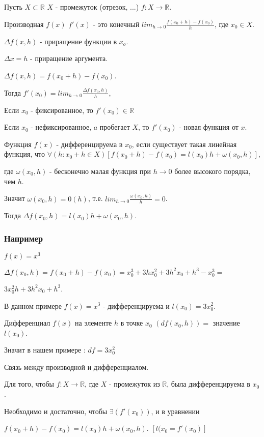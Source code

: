 Пусть $X \subset \mathbb {R}$ $X$ - промежуток (отрезок, ...) $f : X \rightarrow \mathbb {R}$.

\opred

Производная $f(x)$ $f'(x)$ - это конечный $lim_{h \to 0} \frac {f(x_0 + h) - f(x_0)}{h}$, где $x_0 \in X$.

$\Delta f(x,h)$ - приращение функции в $x_o$.

$\Delta x = h$ - приращение аргумента.

$\Delta f(x,h) = f(x_0 + h) - f(x_0)$.

Тогда $f'(x_0)= lim_{h \to 0} \frac{\Delta f(x_0,h)}{h}$,

Если $x_0$ - фиксированное, то $f'(x_0) \in \mathbb {R}$

Если $x_0$ - нефиксированное, $a$ пробегает $X$, то $f'(x_0)$ - новая функция от $x$.

\opred
	
Функция $f(x)$ - дифференцируема в $x_0$, если существует такая линейная функция, что $\forall(h: x_0 + h \in X)[f(x_0 + h)-f(x_0) = l(x_0)h +	\omega(x_0, h)]$,

где $\omega(x_0, h)$ - бесконечно малая функция при $h \rightarrow 0$ более высокого порядка, чем $h$.

Значит $\omega(x_0, h) = 0(h)$, т.е. $lim_{h \to 0} \frac {\omega(x_0, h)}{h} = 0$.

Тогда $\Delta f(x_0, h) = l(x_0)h + \omega(x_0,h)$.

\subsubsection{Например}

$f(x)=x^3$

$\Delta f(x_0, h) = f(x_0 + h)-f(x_0) = x_0^3+3hx_0^2+3h^2x_0+h^3-x_0^3 = $

$3x_0^2h + 3h^2x_0 + h^3$.

В данном примере $f(x)=x^3$ - дифференцируема и $l(x_0) = 3x_0^2$.

\opred

Дифференциал $f(x)$ на элементе $h$ в точке $x_0$ $(df(x_0,h)) =$ значение $l(x_0)$.

Значит в нашем примере : $df = 3x_0^2$ 

\begin{teorema}

Связь между производной и дифференциалом.

Для того, чтобы $f: X \rightarrow \mathbb {R}$, где $X$ - промежуток из $\mathbb {R}$, была дифференцируема в $x_0$.

Необходимо и достаточно, чтобы $\exists (f'(x_0))$, и в уравнении 

$f(x_0 + h) - f(x_0) = l(x_0)h +	\omega(x_0, h)$. $[l(x_0=f'(x_0)]$

\end{teorema}

